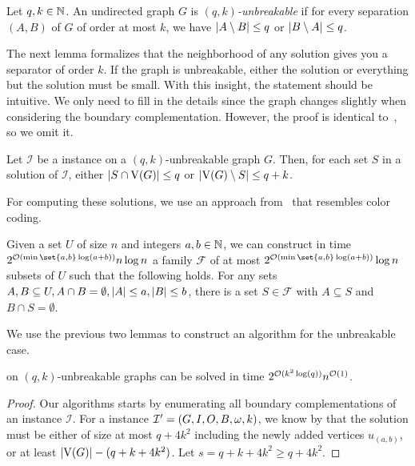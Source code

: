 \begin{theorem}
\begin{lemma}
\begin{definition}[Unbreakability]
  Let $q,k \in \mathbb{N}$. An undirected graph $G$ is \emph{$(q,k)$-unbreakable} if for every separation $(A,B)$ of $G$ of order at most $k$, we have $\abs{A \setminus B} \le q$ or $\abs{B \setminus A} \le q$.
\end{definition}

The next lemma formalizes that the neighborhood of any solution gives you a separator of order $k$. If the graph is unbreakable, either the solution or everything but the solution must be small. With this insight, the statement should be intuitive. We only need to fill in the details since the graph changes slightly when considering the boundary complementation. However, the proof is identical to~\cite[Lemma~12]{golovach2020finding}, so we omit it.

\begin{lemma}\label{lem:unbreak_small_or_large}
  Let $\mathcal{I}$ be a \scsborder{} instance on a $(q,k)$-unbreakable graph $G$. Then, for each set $S$ in a solution of $\mathcal{I}$, either $\abs{S \cap \ve{G}} \le q$ or $\abs{\ve{G} \setminus S} \le q + k$.
\end{lemma}

For computing these solutions, we use an approach from~\cite{chitnis2016designing} that resembles color coding.

\begin{lemma}\label{lem:find_sets}
  Given a set $U$ of size $n$ and integers $a,b \in \mathbb{N}$, we can construct in time $2^{\bigO{\min\set{a,b}\log (a+b)}}n\log n$ a family $\mathcal{F}$ of at most $2^{\bigO{\min\set{a,b}\log (a+b)}}\log n$ subsets of $U$ such that the following holds. For any sets $A, B \subseteq U, A \cap B = \emptyset, \abs{A} \le a, \abs{B} \le b$, there is a set $S \in \mathcal{F}$ with $A \subseteq S$ and $B \cap S = \emptyset$.
\end{lemma}

We use the previous two lemmas to construct an algorithm for the unbreakable case.

\iflong
\begin{theorem}
\else
\begin{theorem}[$\star$]
\fi
\label{thm:unbreakable_scc}
  \scsborder{} on $(q,k)$-unbreakable graphs can be solved in time $2^{\mathcal{O}(k^2 \log(q))}n^{\mathcal{O}(1)}$.
\end{theorem}
\iflong
\begin{proof}
  Our algorithms starts by enumerating all boundary complementations of an instance $\mathcal{I}$. For a \scsrec{} instance $\mathcal{I'} = (G,I,O,B,\operatorname{\omega},k)$, we know by  that the solution must be either of size at most $q+4k^2$ including the newly added vertices $u_{(a,b)}$, or at least $\abs{\ve{G}} - (q+k+4k^2)$. Let $s = q+k+4k^2 \ge q + 4k^2$.


\end{proof}
\end{theorem}
\end{lemma}
\end{theorem}
